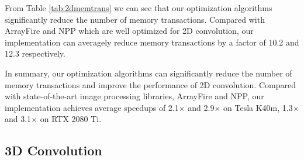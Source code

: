 From Table \ref{tab:2dmemtrans} we can see that our optimization algorithms significantly reduce the number of memory transactions.
Compared with ArrayFire and NPP which are well optimized for 2D convolution, our implementation can averagely reduce memory transactions by
a factor of 10.2 and 12.3 respectively.




In summary, our optimization algorithms can significantly reduce the number of memory transactions and improve the performance of 2D
convolution. Compared with state-of-the-art image processing libraries, ArrayFire and NPP, our implementation achieves average speedups of
2.1$\times$ and 2.9$\times$ on Tesla K40m, 1.3$\times$ and 3.1$\times$ on RTX 2080 Ti.

\subsection{3D Convolution}

